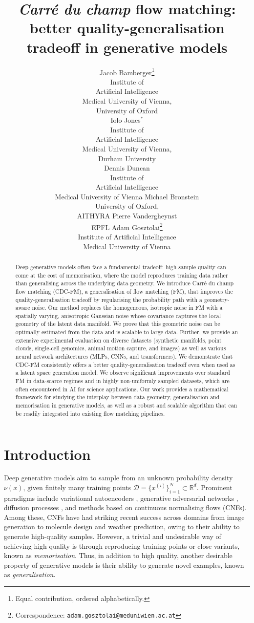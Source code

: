 \documentclass{article} %
\title{\textit{Carr\'{e} du champ} flow matching: better quality-generalisation tradeoff in generative models}
\author{Jacob Bamberger\thanks{Equal contribution, ordered alphabetically.} \\
Institute of \\
Artificial Intelligence \\
Medical University of Vienna, \\
University of Oxford \\
\And
Iolo Jones$^*$ \\
Institute of \\
Artificial Intelligence \\
Medical University of Vienna, \\
Durham University \\
\And
Dennis Duncan \\
Institute of \\
Artificial Intelligence \\
Medical University of Vienna
\And
Michael Bronstein \\
University of Oxford, \\
AITHYRA
\And
Pierre Vandergheynst \\
EPFL
\And
Adam Gosztolai\thanks{Correspondence:
\texttt{adam.gosztolai@meduniwien.ac.at}} \\
Institute of Artificial Intelligence \\
Medical University of Vienna
}
\newcommand{\train}{\mathcal{D}}
\newcommand{\R}{\mathbb{R}}
\begin{document}
\maketitle


\begin{abstract}
    Deep generative models often face a fundamental tradeoff: high sample quality can come at the cost of memorisation, where the model reproduces training data rather than generalising across the underlying data geometry. We introduce Carré du champ flow matching (CDC-FM), a generalisation of flow matching (FM), that improves the quality-generalisation tradeoff by regularising the probability path with a geometry-aware noise. Our method replaces the homogeneous, isotropic noise in FM with a spatially varying, anisotropic Gaussian noise whose covariance captures the local geometry of the latent data manifold. We prove that this geometric noise can be optimally estimated from the data and is scalable to large data. Further, we provide an extensive experimental evaluation on diverse datasets (synthetic manifolds, point clouds, single-cell genomics, animal motion capture, and images) as well as various neural network architectures (MLPs, CNNs, and transformers). We demonstrate that CDC-FM consistently offers a better quality-generalisation tradeoff even when used as a latent space generation model. We observe significant improvements over standard FM in data-scarce regimes and in highly non-uniformly sampled datasets, which are often encountered in AI for science applications. Our work provides a mathematical framework for studying the interplay between data geometry, generalisation and memorisation in generative models, as well as a robust and scalable algorithm that can be readily integrated into existing flow matching pipelines.
\end{abstract}

\section{Introduction}

Deep generative models aim to sample from an unknown probability density $\nu(x)$, given finitely many training points $\train = \{x^{(i)}\}^N_{i=1}\subset\R^d$. 
Prominent paradigms include variational autoencoders \citep{Kingma2014Auto-encodingBayes}, generative adversarial networks \citep{goodfellow2014generative}, diffusion processes \citep{sohl2015deep, ho2020denoising}, and methods based on continuous normalising flows \citep{chen_neural_2019, song_generative_2020, lipman2023flow, albergo_stochastic_2023} (CNFs).
Among these, CNFs have had striking recent success across domains from image generation to molecule design and weather prediction, owing to their ability to generate high-quality samples. 
However, a trivial and undesirable way of achieving high quality is through reproducing training points or close variants, known as \textit{memorisation}.
Thus, in addition to high quality, another desirable property of generative models is their ability to generate novel examples, known as \textit{generalisation}.
\end{document}
